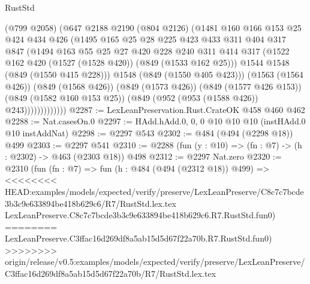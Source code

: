 \begin{lexlean}{RustStd}
\begin{coremodule}
{\begin{coremodule}
{{{{{{{{{                      (@799 @2058)
                      (@647
                        @2188
                        @2190
                        (@804 @2126)
                        (@1481
                          @160
                          @166
                          @153
                          @25
                          @424
                          @434
                          @426
                          (@1495
                            @165
                            @25
                            @28
                            @225
                            @423
                            @433
                            @311
                            @404
                            @317
                            @847
                            (@1494
                              @163
                              @55
                              @25
                              @27
                              @420
                              @228
                              @240
                              @311
                              @414
                              @317
                              (@1522 @162 @420 (@1527 (@1528 @420)) (@849 (@1533 @162 @25)))
                              @1544
                              @1548
                              (@849 (@1550 @415 @228)))
                            @1548
                            (@849 (@1550 @405 @423)))
                          (@1563 (@1564 @426))
                          (@849 (@1568 @426))
                          (@849 (@1573 @426))
                          (@849 (@1577 @426 @153))
                          (@849 (@1582 @160 @153 @25))
                          (@849 (@952 (@953 (@1588 @426)) @243)))))))))))))
@2287 := LexLeanPreservation.Rust.CrateOK @458 @460 @462
@2288 := Nat.casesOn.{0}
@2297 := HAdd.hAdd.{0, 0, 0} @10 @10 @10 (instHAdd.{0} @10 instAddNat)
@2298 := @2297 @543
@2302 := @484 (@494 (@2298 @18)) @499
@2303 := @2297 @541
@2310 := @2288 (fun (y : @10) => (fn : @7) -> (h : @2302) -> @463 (@2303 @18)) @498
@2312 := @2297 Nat.zero
@2320 := @2310
    (fun (fn : @7) =>
    fun (h : @484 (@494 (@2312 @18)) @499) =>
<<<<<<<< HEAD:examples/models/expected/verify/preserve/LexLeanPreserve/C8c7c7bcde3b3c9e633894be418b629c6/R7/RustStd.lex.tex
    LexLeanPreserve.C8c7c7bcde3b3c9e633894be418b629c6.R7.RustStd.fun0)
========
    LexLeanPreserve.C3ffac16d269df8a5ab15d5d67f22a70b.R7.RustStd.fun0)
>>>>>>>> origin/release/v0.5:examples/models/expected/verify/preserve/LexLeanPreserve/C3ffac16d269df8a5ab15d5d67f22a70b/R7/RustStd.lex.tex
}}}}}}}}}
\end{coremodule}}
\end{coremodule}
\end{lexlean}
